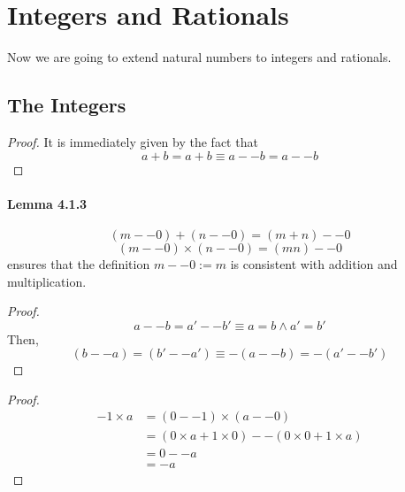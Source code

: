 
\section{Integers and Rationals}
Now we are going to extend natural numbers to integers and rationals.

\subsection{The Integers}

\begin{proof}
It is immediately given by the fact that 
\[
a+b = a+b \equiv a -- b = a -- b
\]
\end{proof}

\paragraph{Lemma 4.1.3}
\[
(m--0)+(n--0) = (m+n)--0
\]
\[
(m--0) \times (n--0) = (mn) -- 0
\]
ensures that the definition $m--0:=m$ is consistent with addition and multiplication.

\begin{proof}
\[
a--b = a'--b' \equiv a=b \wedge a'=b'
\]
Then, 
\[
(b--a) = (b'--a') \equiv -(a--b) = -(a'--b')
\]
\end{proof}

\begin{proof}
\begin{align*}
-1 \times a 
&= (0 -- 1) \times (a -- 0) \\
&= (0\times a + 1 \times 0) -- (0 \times 0 + 1 \times a) \\
&= 0 -- a \\
&= -a
\end{align*}
\end{proof}

